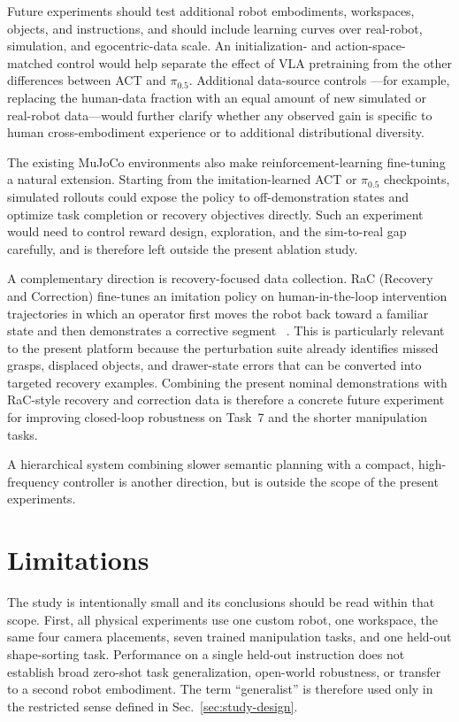 \documentclass[10pt,conference]{IEEEtran}
\begin{document}
Future experiments should test additional robot embodiments, workspaces,
objects, and instructions, and should include learning curves over real-robot,
simulation, and egocentric-data scale. An initialization- and action-space-
matched control would help separate the effect of VLA pretraining from the
other differences between ACT and $\pi_{0.5}$. Additional data-source controls
---for example, replacing the human-data fraction with an equal amount of new
simulated or real-robot data---would further clarify whether any observed gain
is specific to human cross-embodiment experience or to additional
distributional diversity.

The existing MuJoCo environments also make reinforcement-learning fine-tuning a
natural extension. Starting from the imitation-learned ACT or $\pi_{0.5}$
checkpoints, simulated rollouts could expose the policy to off-demonstration
states and optimize task completion or recovery objectives directly. Such an
experiment would need to control reward design, exploration, and the
sim-to-real gap carefully, and is therefore left outside the present ablation
study.

A complementary direction is recovery-focused data collection. RaC (Recovery
and Correction) fine-tunes an imitation policy on human-in-the-loop
intervention trajectories in which an operator first moves the robot back
toward a familiar state and then demonstrates a corrective segment
~\cite{hu2025rac}. This is particularly relevant to the present platform because the
perturbation suite already identifies missed grasps, displaced objects, and
drawer-state errors that can be converted into targeted recovery examples.
Combining the present nominal demonstrations with RaC-style recovery and
correction data is therefore a concrete future experiment for improving
closed-loop robustness on Task~7 and the shorter manipulation tasks.

A hierarchical system combining slower semantic planning with a compact,
high-frequency controller is another direction, but is outside the scope of the
present experiments.

\section{Limitations}
\label{sec:limitations}

The study is intentionally small and its conclusions should be read within that
scope. First, all physical experiments use one custom robot, one workspace, the
same four camera placements, seven trained manipulation tasks, and one held-out
shape-sorting task. Performance on a single held-out instruction does not
establish broad zero-shot task generalization, open-world robustness, or
transfer to a second robot embodiment. The term ``generalist'' is therefore used only in the
restricted sense defined in
Sec.~\ref{sec:study-design}.
\end{document}
